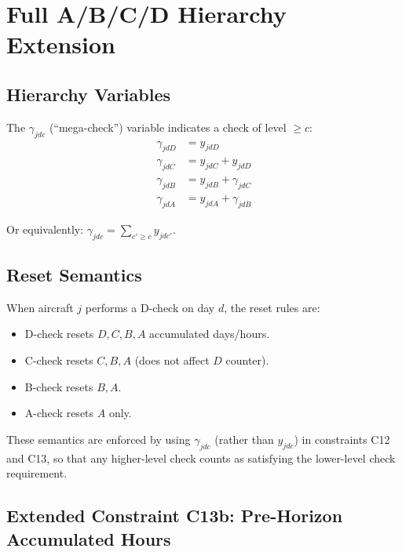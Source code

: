 \documentclass[11pt, a4paper]{article}
\theoremstyle{plain}
\theoremstyle{definition}
\theoremstyle{remark}
\begin{document}
\section{Full A/B/C/D Hierarchy Extension}

\subsection{Hierarchy Variables}

The $\gamma_{jdc}$ (``mega-check'') variable indicates a check of level $\geq c$:
\begin{align}
  \gamma_{jdD} &= y_{jdD} \label{eq:hier_D} \\
  \gamma_{jdC} &= y_{jdC} + y_{jdD} \label{eq:hier_C} \\
  \gamma_{jdB} &= y_{jdB} + \gamma_{jdC} \label{eq:hier_B} \\
  \gamma_{jdA} &= y_{jdA} + \gamma_{jdB} \label{eq:hier_A}
\end{align}

Or equivalently: $\gamma_{jdc} = \sum_{c' \geq c} y_{jdc'}$.

\subsection{Reset Semantics}

When aircraft $j$ performs a D-check on day $d$, the reset rules are:
\begin{itemize}
  \item D-check resets $D, C, B, A$ accumulated days/hours.
  \item C-check resets $C, B, A$ (does not affect $D$ counter).
  \item B-check resets $B, A$.
  \item A-check resets $A$ only.
\end{itemize}

These semantics are enforced by using $\gamma_{jdc}$ (rather than $y_{jdc}$)
in constraints C12 and C13, so that any higher-level check counts as
satisfying the lower-level check requirement.

\subsection{Extended Constraint C13b: Pre-Horizon Accumulated Hours}
\end{document}
